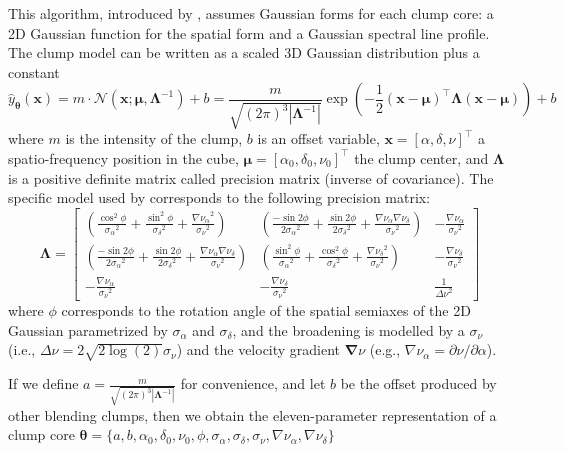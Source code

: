 \documentclass[manuscript]{aastex}
\newcommand{\vl}[1]{{\mathbf #1}}
\newcommand{\vs}[1]{{\boldsymbol #1}}
\begin{document}
This algorithm, introduced by \citep{Stutzki90}, assumes Gaussian forms for 
each clump core: a 2D Gaussian function for the spatial form and a
Gaussian spectral line profile. The clump model can be written as a scaled 
3D Gaussian distribution plus a constant
\begin{equation}
\hat{y}_\vs{\theta}(\vl{x})=m\cdot\mathcal{N}(\vl{x};\vs{\mu},\vs{\Lambda}^{-1}) + b
=\frac{m}{\sqrt{(2\pi)^3|\vs{\Lambda}^{-1}|}}
\exp\left(-\frac{1}{2}({\vl{x}}-{\vs{\mu}})^\top{\vs{\Lambda}}({\vl{x}}-{\vs{\mu}})\right)
+ b
\end{equation}
where $m$ is the intensity of the clump, $b$ is an offset variable, 
$\vl{x} = [ \alpha,\delta,\nu ]^\top$
a spatio-frequency position in the cube, $\vs{\mu} = [ \alpha_0,\delta_0,\nu_0
]^\top$ the 
clump center, and $\vs{\Lambda}$ is a positive definite matrix called precision
matrix (inverse of covariance). The specific model used by \citet{Stutzki90} corresponds to the
following precision matrix:
\begin{equation}
\vs{\Lambda} =
\left[ \begin{array}{ccc}
\left(\frac{\cos^2\phi}{{\sigma_\alpha}^2} + \frac{\sin^2\phi}{{\sigma_\delta}^2} +
\frac{{\nabla \nu_\alpha}^2}{{\sigma_\nu}^2}\right) &
\left(\frac{-\sin2\phi}{2{\sigma_\alpha}^2} + \frac{\sin2\phi}{2{\sigma_\delta}^2} +
\frac{{\nabla \nu_\alpha} {\nabla \nu_\delta} }{{\sigma_\nu}^2}\right) & 
- \frac{{\nabla \nu_\alpha}}{{\sigma_\nu}^2}  \\
\left(\frac{-\sin2\phi}{2{\sigma_\alpha}^2} +
\frac{\sin2\phi}{2{\sigma_\delta}^2} +
\frac{{\nabla \nu_\alpha} {\nabla \nu_\delta} }{{\sigma_\nu}^2}\right) & 
\left(\frac{\sin^2\phi}{{\sigma_\alpha}^2} + \frac{\cos^2\phi}{{\sigma_\delta}^2} +
\frac{{\nabla \nu_\delta}^2}{{\sigma_\nu}^2} \right) &
- \frac{{\nabla \nu_\delta}}{{\sigma_\nu}^2} \\
- \frac{{\nabla \nu_\alpha}}{{\sigma_\nu}^2} &
- \frac{{\nabla \nu_\delta}}{{\sigma_\nu}^2} &
\frac{1}{{\Delta \nu}^2}
\end{array} \right]
\end{equation}
where $\phi$ corresponds to the rotation angle of the spatial semiaxes of the
2D Gaussian parametrized by $\sigma_\alpha$ and $\sigma_\delta$, and the
broadening is modelled by a $\sigma_\nu$ (i.e., $\Delta \nu=2\sqrt{2\log(2)} \sigma_\nu$)
and the velocity gradient $\vs{\nabla\nu}$ (e.g., $\nabla\nu_\alpha = \partial
\nu/\partial\alpha $). 

If we define $a=\frac{m}{\sqrt{(2\pi)^3|\vs{\Lambda}^{-1}|}}$
for convenience, and let $b$ be the offset produced by other
blending clumps, then we obtain the eleven-parameter 
representation of a clump core $\vs{\theta}=
\{a,b,\alpha_0,\delta_0,\nu_0,\phi,\sigma_\alpha,\sigma_\delta, \sigma_\nu,
\nabla\nu_\alpha,\nabla\nu_\delta\}$ 
\end{document}
